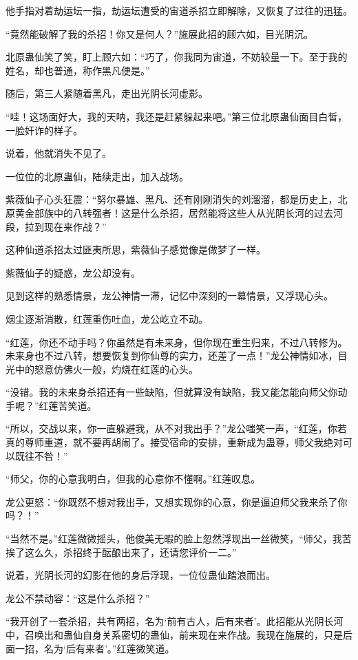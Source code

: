 \begin{this_body}
他手指对着劫运坛一指，劫运坛遭受的宙道杀招立即解除，又恢复了过往的迅猛。

“竟然能破解了我的杀招！你又是何人？”施展此招的顾六如，目光阴沉。

北原蛊仙笑了笑，盯上顾六如：“巧了，你我同为宙道，不妨较量一下。至于我的姓名，却也普通，称作黑凡便是。”

随后，第三人紧随着黑凡，走出光阴长河虚影。

“哇！这场面好大，我的天呐，我还是赶紧躲起来吧。”第三位北原蛊仙面目白皙，一脸奸诈的样子。

说着，他就消失不见了。

一位位的北原蛊仙，陆续走出，加入战场。

紫薇仙子心头狂震：“努尔暴雄、黑凡、还有刚刚消失的刘溜溜，都是历史上，北原黄金部族中的八转强者！这是什么杀招，居然能将这些人从光阴长河的过去河段，拉到现在来作战？”

这种仙道杀招太过匪夷所思，紫薇仙子感觉像是做梦了一样。

紫薇仙子的疑惑，龙公却没有。

见到这样的熟悉情景，龙公神情一滞，记忆中深刻的一幕情景，又浮现心头。

烟尘逐渐消散，红莲重伤吐血，龙公屹立不动。

“红莲，你还不动手吗？你虽然是有未来身，但你现在重生归来，不过八转修为。未来身也不过八转，想要恢复到你仙尊的实力，还差了一点！”龙公神情如冰，目光中的怒意仿佛火一般，灼烧在红莲的心头。

“没错。我的未来身杀招还有一些缺陷，但就算没有缺陷，我又能怎能向师父你动手呢？”红莲苦笑道。

“所以，交战以来，你一直躲避我，从不对我出手？”龙公嗤笑一声，“红莲，你若真的尊师重道，就不要再胡闹了。接受宿命的安排，重新成为蛊尊，师父我绝对可以既往不咎！”

“师父，你的心意我明白，但我的心意你不懂啊。”红莲叹息。

龙公更怒：“你既然不想对我出手，又想实现你的心意，你是逼迫师父我来杀了你吗？！”

“当然不是。”红莲微微摇头，他俊美无暇的脸上忽然浮现出一丝微笑，“师父，我苦挨了这么久，杀招终于酝酿出来了，还请您评价一二。”

说着，光阴长河的幻影在他的身后浮现，一位位蛊仙踏浪而出。

龙公不禁动容：“这是什么杀招？”

“我开创了一套杀招，共有两招，名为‘前有古人，后有来者’。此招能从光阴长河中，召唤出和蛊仙自身关系密切的蛊仙，前来现在来作战。我现在施展的，只是后面一招，名为‘后有来者’。”红莲微笑道。


\end{this_body}
